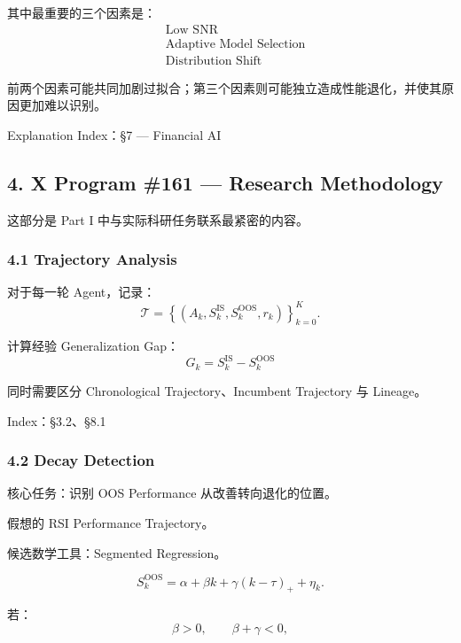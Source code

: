 其中最重要的三个因素是：
\[\boxed{
\begin{aligned}
&\text{Low SNR}\\
&\text{Adaptive Model Selection}\\
&\text{Distribution Shift}
\end{aligned}
}\]

前两个因素可能共同加剧过拟合；第三个因素则可能独立造成性能退化，并使其原因更加难以识别。

Explanation Index：§7 --- Financial AI

\hypertarget{part-1-10-0001-x-program-161-research-methodology}{%
\subsection{4. X Program \#161 --- Research Methodology}\label{part-1-10-0001-x-program-161-research-methodology}}

这部分是 Part I 中与实际科研任务联系最紧密的内容。

\hypertarget{part-1-10-0001-trajectory-analysis}{%
\subsubsection{4.1 Trajectory Analysis}\label{part-1-10-0001-trajectory-analysis}}

对于每一轮 Agent，记录：
\[\mathcal T=
\left\{
(A_k,S_k^{\mathrm{IS}},S_k^{\mathrm{OOS}},r_k)
\right\}_{k=0}^{K}.\]

计算经验 Generalization Gap：
\[\boxed{
G_k=S_k^{\mathrm{IS}}-S_k^{\mathrm{OOS}}
}\]

同时需要区分 Chronological Trajectory、Incumbent Trajectory 与 Lineage。

Index：§3.2、§8.1

\hypertarget{part-1-10-0001-decay-detection}{%
\subsubsection{4.2 Decay Detection}\label{part-1-10-0001-decay-detection}}

核心任务：识别 OOS Performance 从改善转向退化的位置。


假想的 RSI Performance Trajectory。

候选数学工具：Segmented Regression。

\[S_k^{\mathrm{OOS}}
=
\alpha+\beta k+\gamma(k-\tau)_+
+\eta_k.\]

若：
\[\beta>0,
\qquad
\beta+\gamma<0,\]

